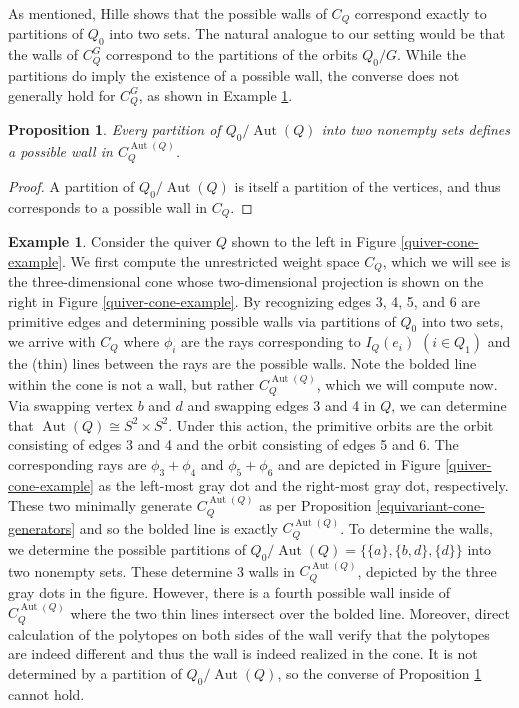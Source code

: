 \documentclass[11pt]{amsart}
\theoremstyle{plain}
\newtheorem{proposition}[theorem]{Proposition}
\theoremstyle{definition}
\newtheorem{example}[theorem]{Example}
\DeclareMathOperator{\aut}{Aut}
\begin{document}
As mentioned, Hille shows that the possible walls of $C_Q$ correspond exactly to partitions of $Q_0$ into two sets. The natural analogue to our setting would be that the walls of $C_Q^G$ correspond to the partitions of the orbits $Q_0/G$. While the partitions do imply the existence of a possible wall, the converse does not generally hold for $C_Q^G$, as shown in Example \ref{vertex-partition-counterexample}.

\begin{proposition} \label{wall-orbit-partition}
    Every partition of $Q_0 / \aut(Q)$ into two nonempty sets defines a possible wall in $C_Q^{\aut(Q)}$.
\end{proposition}

\begin{proof}
    A partition of $Q_0 / \aut(Q)$ is itself a partition of the vertices, and thus corresponds to a possible wall in $C_Q$.
\end{proof}

\begin{example} \label{vertex-partition-counterexample}
    Consider the quiver $Q$ shown to the left in Figure \ref{quiver-cone-example}. We first compute the unrestricted weight space $C_Q$, which we will see is the three-dimensional cone whose two-dimensional projection is shown on the right in Figure \ref{quiver-cone-example}. By recognizing edges 3, 4, 5, and 6 are primitive edges and determining possible walls via partitions of $Q_0$ into two sets, we arrive with $C_Q$ where $\phi_i$ are the rays corresponding to $I_Q(e_i)$ $(i \in Q_1)$ and the (thin) lines between the rays are the possible walls. Note the bolded line within the cone is not a wall, but rather $C_Q^{\aut(Q)}$, which we will compute now. Via swapping vertex $b$ and $d$ and swapping edges 3 and 4 in $Q$, we can determine that $\aut(Q) \cong S^2 \times S^2$. Under this action, the primitive orbits are the orbit consisting of edges 3 and 4 and the orbit consisting of edges 5 and 6. The corresponding rays are $\phi_3 + \phi_4$ and $\phi_5 + \phi_6$ and are depicted in Figure \ref{quiver-cone-example} as the left-most gray dot and the right-most gray dot, respectively. These two minimally generate $C_Q^{\aut(Q)}$ as per Proposition \ref{equivariant-cone-generators} and so the bolded line is exactly $C_Q^{\aut(Q)}$. To determine the walls, we determine the possible partitions of $Q_0 /\aut(Q) = \{\{a\}, \{b, d\}, \{d\}\}$ into two nonempty sets. These determine 3 walls in $C_Q^{\aut(Q)}$, depicted by the three gray dots in the figure. However, there is a fourth possible wall inside of $C_Q^{\aut(Q)}$ where the two thin lines intersect over the bolded line. Moreover, direct calculation of the polytopes on both sides of the wall verify that the polytopes are indeed different and thus the wall is indeed realized in the cone. It is not determined by a partition of $Q_0 /\aut(Q)$, so the converse of Proposition \ref{wall-orbit-partition} cannot hold.
    

\end{example}
\end{document}
